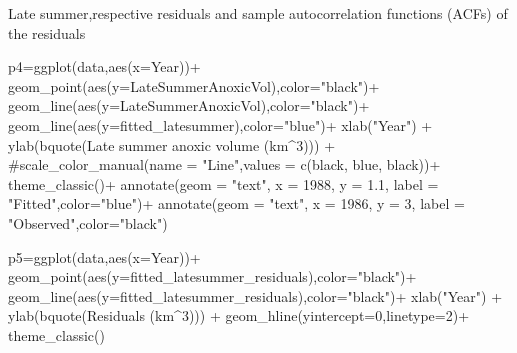 \documentclass[
  letterpaper,
  DIV=11,
  numbers=noendperiod]{scrartcl}
\newenvironment{Shaded}{\begin{snugshade}}{\end{snugshade}}
\newcommand{\AttributeTok}[1]{\textcolor[rgb]{0.40,0.45,0.13}{#1}}
\newcommand{\CommentTok}[1]{\textcolor[rgb]{0.37,0.37,0.37}{#1}}
\newcommand{\DecValTok}[1]{\textcolor[rgb]{0.68,0.00,0.00}{#1}}
\newcommand{\FloatTok}[1]{\textcolor[rgb]{0.68,0.00,0.00}{#1}}
\newcommand{\FunctionTok}[1]{\textcolor[rgb]{0.28,0.35,0.67}{#1}}
\newcommand{\NormalTok}[1]{\textcolor[rgb]{0.00,0.23,0.31}{#1}}
\newcommand{\OtherTok}[1]{\textcolor[rgb]{0.00,0.23,0.31}{#1}}
\newcommand{\SpecialCharTok}[1]{\textcolor[rgb]{0.37,0.37,0.37}{#1}}
\newcommand{\StringTok}[1]{\textcolor[rgb]{0.13,0.47,0.30}{#1}}
\begin{document}
Late summer,respective residuals and sample autocorrelation functions
(ACFs) of the residuals

\begin{Shaded}
\begin{Highlighting}[]
\NormalTok{p4}\OtherTok{=}\FunctionTok{ggplot}\NormalTok{(data,}\FunctionTok{aes}\NormalTok{(}\AttributeTok{x=}\NormalTok{Year))}\SpecialCharTok{+}
  \FunctionTok{geom\_point}\NormalTok{(}\FunctionTok{aes}\NormalTok{(}\AttributeTok{y=}\NormalTok{LateSummerAnoxicVol),}\AttributeTok{color=}\StringTok{"black"}\NormalTok{)}\SpecialCharTok{+}
  \FunctionTok{geom\_line}\NormalTok{(}\FunctionTok{aes}\NormalTok{(}\AttributeTok{y=}\NormalTok{LateSummerAnoxicVol),}\AttributeTok{color=}\StringTok{"black"}\NormalTok{)}\SpecialCharTok{+}
  \FunctionTok{geom\_line}\NormalTok{(}\FunctionTok{aes}\NormalTok{(}\AttributeTok{y=}\NormalTok{fitted\_latesummer),}\AttributeTok{color=}\StringTok{"blue"}\NormalTok{)}\SpecialCharTok{+}
  \FunctionTok{xlab}\NormalTok{(}\StringTok{"Year"}\NormalTok{) }\SpecialCharTok{+}
  \FunctionTok{ylab}\NormalTok{(}\FunctionTok{bquote}\NormalTok{(}\StringTok{\textquotesingle{}Late summer anoxic volume\textquotesingle{}}\NormalTok{ (km}\SpecialCharTok{\^{}}\DecValTok{3}\NormalTok{))) }\SpecialCharTok{+}
  \CommentTok{\#scale\_color\_manual(name = "Line",values = c(\textquotesingle{}black\textquotesingle{}, \textquotesingle{}blue\textquotesingle{}, \textquotesingle{}black\textquotesingle{}))+}
  \FunctionTok{theme\_classic}\NormalTok{()}\SpecialCharTok{+}
  \FunctionTok{annotate}\NormalTok{(}\AttributeTok{geom =} \StringTok{"text"}\NormalTok{, }\AttributeTok{x =} \DecValTok{1988}\NormalTok{, }\AttributeTok{y =} \FloatTok{1.1}\NormalTok{, }\AttributeTok{label =} \StringTok{"Fitted"}\NormalTok{,}\AttributeTok{color=}\StringTok{"blue"}\NormalTok{)}\SpecialCharTok{+}
  \FunctionTok{annotate}\NormalTok{(}\AttributeTok{geom =} \StringTok{"text"}\NormalTok{, }\AttributeTok{x =} \DecValTok{1986}\NormalTok{, }\AttributeTok{y =} \DecValTok{3}\NormalTok{, }\AttributeTok{label =} \StringTok{"Observed"}\NormalTok{,}\AttributeTok{color=}\StringTok{"black"}\NormalTok{)}
  
\NormalTok{p5}\OtherTok{=}\FunctionTok{ggplot}\NormalTok{(data,}\FunctionTok{aes}\NormalTok{(}\AttributeTok{x=}\NormalTok{Year))}\SpecialCharTok{+}
  \FunctionTok{geom\_point}\NormalTok{(}\FunctionTok{aes}\NormalTok{(}\AttributeTok{y=}\NormalTok{fitted\_latesummer\_residuals),}\AttributeTok{color=}\StringTok{"black"}\NormalTok{)}\SpecialCharTok{+}
  \FunctionTok{geom\_line}\NormalTok{(}\FunctionTok{aes}\NormalTok{(}\AttributeTok{y=}\NormalTok{fitted\_latesummer\_residuals),}\AttributeTok{color=}\StringTok{"black"}\NormalTok{)}\SpecialCharTok{+}
  \FunctionTok{xlab}\NormalTok{(}\StringTok{"Year"}\NormalTok{) }\SpecialCharTok{+}
  \FunctionTok{ylab}\NormalTok{(}\FunctionTok{bquote}\NormalTok{(}\StringTok{\textquotesingle{}Residuals\textquotesingle{}}\NormalTok{ (km}\SpecialCharTok{\^{}}\DecValTok{3}\NormalTok{))) }\SpecialCharTok{+}
  \FunctionTok{geom\_hline}\NormalTok{(}\AttributeTok{yintercept=}\DecValTok{0}\NormalTok{,}\AttributeTok{linetype=}\DecValTok{2}\NormalTok{)}\SpecialCharTok{+}
  \FunctionTok{theme\_classic}\NormalTok{()}


\end{Highlighting}
\end{Shaded}
\end{document}
